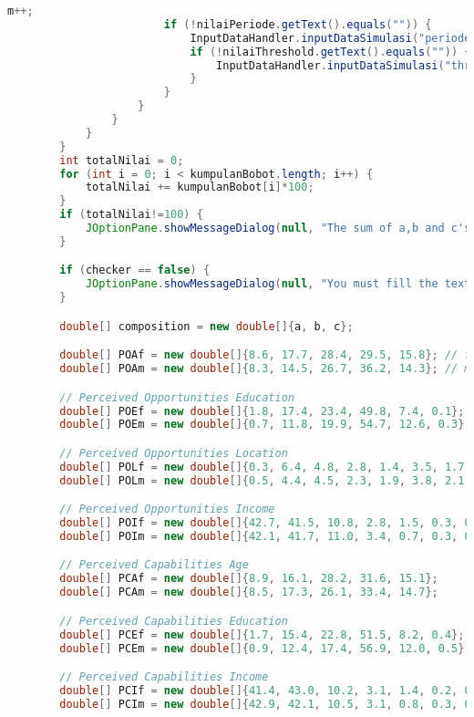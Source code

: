 \begin{lstlisting}[language=Java, caption=Entrepreneurs.java]
                        m++;
                        if (!nilaiPeriode.getText().equals("")) {
                            InputDataHandler.inputDataSimulasi("periode", nilaiPeriode.getText());
                            if (!nilaiThreshold.getText().equals("")) {
                                InputDataHandler.inputDataSimulasi("threshold", nilaiThreshold.getText());
                            }
                        }
                    }
                }
            }
        }
        int totalNilai = 0;
        for (int i = 0; i < kumpulanBobot.length; i++) {
            totalNilai += kumpulanBobot[i]*100;
        }
        if (totalNilai!=100) {
            JOptionPane.showMessageDialog(null, "The sum of a,b and c's value must 1!");
        }

        if (checker == false) {
            JOptionPane.showMessageDialog(null, "You must fill the text field first!");
        }

        double[] composition = new double[]{a, b, c};

        double[] POAf = new double[]{8.6, 17.7, 28.4, 29.5, 15.8}; // female
        double[] POAm = new double[]{8.3, 14.5, 26.7, 36.2, 14.3}; // male

        // Perceived Opportunities Education
        double[] POEf = new double[]{1.8, 17.4, 23.4, 49.8, 7.4, 0.1};
        double[] POEm = new double[]{0.7, 11.8, 19.9, 54.7, 12.6, 0.3};

        // Perceived Opportunities Location
        double[] POLf = new double[]{0.3, 6.4, 4.8, 2.8, 1.4, 3.5, 1.7, 46.3, 9.6, 6.1, 9.5, 2.5, 1.1, 1.0, 0.6, 2.4}; 
        double[] POLm = new double[]{0.5, 4.4, 4.5, 2.3, 1.9, 3.8, 2.1, 47.6, 11.1, 6.3, 8.4, 2.7, 0.9, 1.1, 0.5, 2.0};

        // Perceived Opportunities Income
        double[] POIf = new double[]{42.7, 41.5, 10.8, 2.8, 1.5, 0.3, 0, 0.5}; 
        double[] POIm = new double[]{42.1, 41.7, 11.0, 3.4, 0.7, 0.3, 0.5, 0.2};

        // Perceived Capabilities Age
        double[] PCAf = new double[]{8.9, 16.1, 28.2, 31.6, 15.1}; 
        double[] PCAm = new double[]{8.5, 17.3, 26.1, 33.4, 14.7};    

        // Perceived Capabilities Education
        double[] PCEf = new double[]{1.7, 15.4, 22.8, 51.5, 8.2, 0.4}; 
        double[] PCEm = new double[]{0.9, 12.4, 17.4, 56.9, 12.0, 0.5}; 

        // Perceived Capabilities Income
        double[] PCIf = new double[]{41.4, 43.0, 10.2, 3.1, 1.4, 0.2, 0.2, 0.4}; 
        double[] PCIm = new double[]{42.9, 42.1, 10.5, 3.1, 0.8, 0.3, 0.2, 0.2};


\end{lstlisting}
